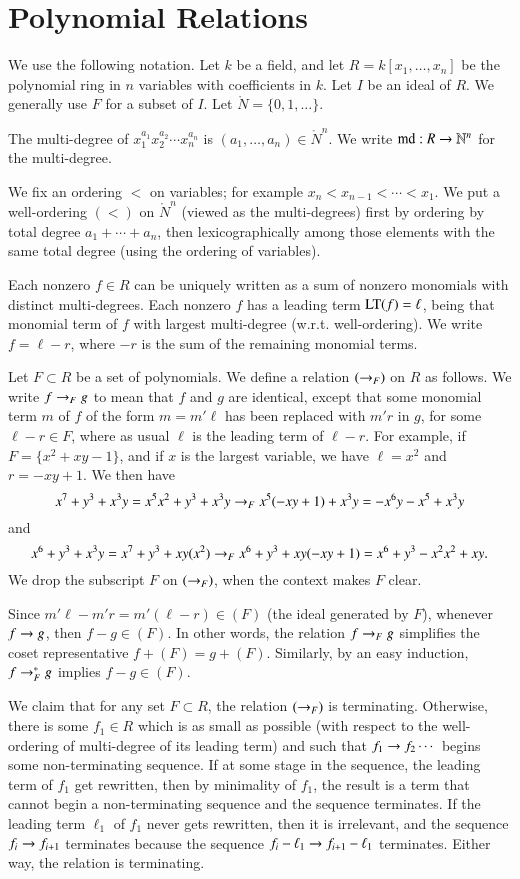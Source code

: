 \documentclass{llncs}
\def\op#1{{\hbox{#1}}}
\def\l{<}
\begin{document}
\section{Polynomial Relations}

We use the following notation.   Let $k$ be a field, and let $R=k[x_1,\ldots,x_n]$ be the polynomial ring in $n$ variables with coefficients in $k$.  Let $I$ be an ideal of $R$.  We generally use $F$ for a subset of $I$.  Let $\ring{N}=\{0,1,\ldots\}$.

The multi-degree of $x_1^{a_1} x_2^{a_2} \cdots x_n^{a_n}$ is $(a_1,\ldots,a_n)\in \ring{N}^n$.
We write $\op{md}:R\to \ring{N}^n$ for the multi-degree.

We fix an ordering $\l$ on variables; for example $x_n < x_{n-1} < \cdots < x_1$.  We put a well-ordering $(<)$ on $\ring{N}^n$ (viewed as the multi-degrees)  first by ordering
by total degree $a_1+\cdots+a_n$, then lexicographically among those elements with the same total degree (using the ordering of variables).

Each nonzero $f\in R$ can be uniquely written as a sum of nonzero monomials with distinct multi-degrees.  Each nonzero $f$ has a leading term $\LT(f)=\ell$, being that monomial term of $f$ with largest multi-degree (w.r.t. well-ordering).  We write $f = \ell - r$, where $-r$ is the sum of the remaining monomial terms.


Let $F\subset R$ be a set of polynomials.  We define a relation $(\rightarrow_F)$ on $R$ as follows.
We write $f \rightarrow_F g$ to mean that $f$ and $g$ are identical, except that some monomial term $m$ of $f$ of the form $m=m' \ell$ has been replaced with $m' r$ in $g$, for some
$\ell-r\in F$, where as usual $\ell$ is the leading term of $\ell-r$.
For example, if $F = \{x^2 + xy - 1\}$, and if $x$ is the largest variable,
we have $\ell=x^2$ and $r= - x y +1$. We then
have
\[
x^7 + y^3 + x^3 y = x^5 x^2 + y^3 + x^3 y \rightarrow_F x^5 (- x y + 1) + x^3 y = -x^6 y - x^5 + x^3 y
\]
and
\[
x^6 + y^3 + x^3 y = x^7 + y^3 + x y (x^2) \rightarrow_F x^6 + y^3 + x y (-x y + 1) = x^6 + y^3 - x^2 x^2 + x y.
\]
We drop the subscript $F$ on $(\rightarrow_F)$, when the context makes $F$ clear.

Since $m' \ell - m' r = m'(\ell-r)\in (F)$ (the ideal generated by $F$), 
whenever $f\rightarrow g$, then $f- g\in (F)$.
In other words, the relation $f \rightarrow_F g$ simplifies the coset representative
$f+(F) = g + (F)$.  Similarly, by an easy induction, $f\rightarrow^*_F g$ implies $f - g \in (F)$.

We claim that for any set $F\subset R$, the relation $(\rightarrow_F)$ is terminating.  Otherwise, there is some $f_1\in R$ which is as small as possible (with respect to the well-ordering of multi-degree of its leading term) and such that $f_1\rightarrow f_2\cdots$ begins some non-terminating sequence.  If at some stage in the sequence, the leading term of $f_1$ get rewritten, then by minimality of $f_1$,  the result is a term that cannot begin a non-terminating sequence and 
the sequence terminates.  If the leading term $\ell_1$ of $f_1$ never gets rewritten, then it is irrelevant, and  the sequence $f_i \rightarrow f_{i+1}$ terminates because the sequence $f_i - \ell_1 \rightarrow f_{i+1}-\ell_1$ terminates.  Either way, the relation is terminating.
\end{document}
